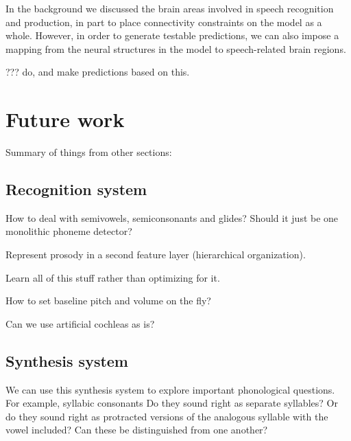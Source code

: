 In the background we discussed the brain areas
involved in speech recognition and production,
in part to place connectivity constraints
on the model as a whole.
However, in order to generate testable predictions,
we can also impose a mapping from
the neural structures in the model
to speech-related brain regions.

??? do, and make predictions based on this.

\section{Future work}

Summary of things from other sections:

\subsection{Recognition system}

How to deal with semivowels, semiconsonants and glides?
Should it just be one monolithic phoneme detector?

Represent prosody in a second feature layer (hierarchical organization).

Learn all of this stuff rather than optimizing for it.

How to set baseline pitch and volume on the fly?

Can we use artificial cochleas as is?

\subsection{Synthesis system}

We can use this synthesis system to explore
important phonological questions.
For example, syllabic consonants
Do they sound right as separate syllables?
Or do they sound right as protracted versions
of the analogous syllable with the vowel included?
Can these be distinguished from one another?
